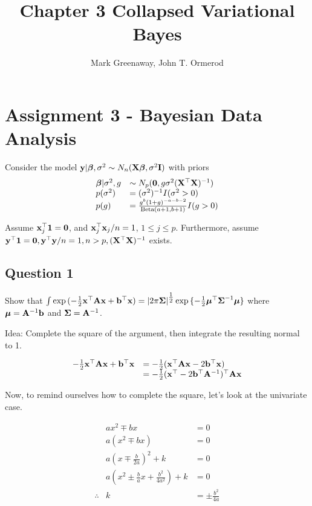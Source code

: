 \documentclass{article}[12pt]
\title{Chapter 3 Collapsed Variational Bayes}
\author{Mark Greenaway, John T. Ormerod}
\begin{document}
\maketitle

\section{Assignment 3 - Bayesian Data Analysis}

Consider the model ${\bf y} | {\boldsymbol \beta}, \sigma^2 \sim N_n({\bf X} {\boldsymbol \beta}, \sigma^2 {\bf I})$ with priors
\begin{equation*}
\begin{array}{ll}
{\boldsymbol\beta} | \sigma^2, g &\sim N_p({\bf 0}, g \sigma^2({\bf X}^\top {\bf X})^{-1}) \\
p(\sigma^2) &= (\sigma^2)^{-1} I(\sigma^2 > 0) \\
p(g) &= \frac{g^b (1 + g)^{-a - b - 2}}{\text{Beta}(a + 1, b + 1)} I(g > 0)
\end{array}
\end{equation*}

Assume ${\bf x}_j^\top{\bf1} = {\bf 0}$, and ${\bf x}_j^\top {\bf x}_j / n = 1$, $1 \leq j \leq p$.
Furthermore, assume ${\bf y}^\top {\bf1} = {\bf 0}, {\bf y}^\top {\bf y} / n  = 1, n > p, ({\bf X}^\top {\bf X})^{-1}$ exists.

\subsection{Question 1}

Show that $\int \exp{(- \tfrac{1}{2} {\bf x}^\top {\bf A}{\bf x}+ {\bf b}^\top {\bf x})} = |2 \pi {\boldsymbol\Sigma}|^{\tfrac{1}{2}} \exp{\{ - \tfrac{1}{2} {\boldsymbol\mu}^\top {\boldsymbol\Sigma}^{-1} {\boldsymbol\mu}\}}$ where ${\boldsymbol \mu} = {\bf A}^{-1} {\bf b}$ and ${\boldsymbol \Sigma} = {\bf A}^{-1}$.

Idea: Complete the square of the argument, then integrate the resulting normal to 1.

\begin{equation*}
\begin{array}{ll}
-\tfrac{1}{2} {\bf x}^\top {\bf A} {\bf x} + {\bf b}^\top {\bf x} &= -\tfrac{1}{2} ({\bf x}^\top {\bf A} {\bf x} - 2 {\bf b}^\top {\bf x}) \\
&= -\tfrac{1}{2} ({\bf x}^\top - 2 {\bf b}^\top {\bf A}^{-1})^\top {\bf A} {\bf x}
\end{array}
\end{equation*}

Now, to remind ourselves how to complete the square, let's look at the univariate case.

\begin{equation*}
\begin{array}{rcl}
& ax^2 \mp bx &= 0 \\
& a(x^2 \mp bx) &= 0 \\
& a(x \mp \frac{b}{2a})^2 + k &= 0 \\
& a(x^2 \pm \frac{b}{a} x + \frac{b^2}{4a^2}) + k &= 0 \\
\therefore & k &= \pm \frac{b^2}{4a}
\end{array}
\end{equation*}
\end{document}
